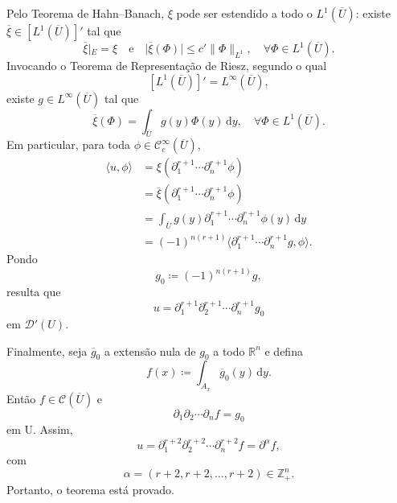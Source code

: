 \documentclass[../distribution_theory_notes.tex]{subfiles}
\begin{document}
Pelo Teorema de Hahn--Banach, \(\xi \) pode ser estendido a todo o \(L^{1}(\overline{U})\): existe \(\overline{\xi}\in [L^{1}(\overline{U})]'\) tal que
\[
	\overline{\xi}|_{E}=\xi
	\quad\text{e}\quad
	| \overline{\xi}(\Phi ) |\leq c'\| \Phi \|_{L^{1}},
	\quad \forall \Phi \in L^{1}(\overline{U}).
\]
Invocando o Teorema de Representação de Riesz, segundo o qual
\[
	[L^{1}(\overline{U})]'=L^{\infty}(\overline{U}),
\]
existe \(g\in L^{\infty}(\overline{U})\) tal que
\[
	\overline{\xi}(\Phi )=\int_{\overline{U}}^{}g(y)\Phi (y)\,\mathrm{d}y,
	\quad \forall \Phi \in L^{1}(\overline{U}).
\]
Em particular, para toda \(\phi \in \mathcal{C}_{c}^{\infty}(\overline{U})\),
\begin{align*}
	\langle u, \phi  \rangle
	 & =\xi(\partial_{1}^{r+1}\cdots \partial_{n}^{r+1}\phi)                                       \\
	 & =\overline{\xi}(\partial_{1}^{r+1}\cdots \partial_{n}^{r+1}\phi)                            \\
	 & =\int_{\overline{U}}^{}g(y)\partial_{1}^{r+1}\cdots \partial_{n}^{r+1}\phi (y)\,\mathrm{d}y \\
	 & =(-1)^{n(r+1)}\langle \partial_{1}^{r+1}\cdots \partial_{n}^{r+1}g, \phi  \rangle.
\end{align*}
Pondo
\[
	g_{0}\coloneqq (-1)^{n(r+1)}g,
\]
resulta que
\[
	u=\partial_{1}^{r+1}\partial_{2}^{r+1}\cdots \partial_{n}^{r+1}g_{0}
\]
em \(\mathcal{D}'(U)\).

Finalmente, seja \(\overline{g}_{0}\) a extensão nula de \(g_{0}\) a todo \(\mathbb{R}^{n}\) e defina
\[
	f(x)\coloneqq \int_{A_{x}}^{}\overline{g}_{0}(y)\,\mathrm{d}y.
\]
Então \(f\in \mathcal{C}(\overline{U})\) e
\[
	\partial_{1}\partial_{2}\cdots \partial_{n}f=g_{0}
\]
em U. Assim,
\[
	u=\partial_{1}^{r+2}\partial_{2}^{r+2}\cdots \partial_{n}^{r+2}f
	=\partial^{\alpha }f,
\]
com
\[
	\alpha =(r+2,r+2,\dotsc ,r+2)\in \mathbb{Z}_{+}^{n}.
\]
Portanto, o teorema está provado. \qedsymbol
\end{document}
